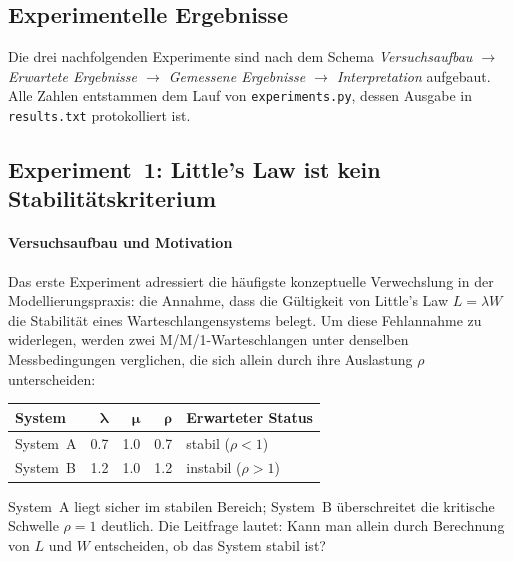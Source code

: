 ﻿\documentclass[a4paper,12pt]{report}
\theoremstyle{definition}
\begin{document}
\subsection{Experimentelle Ergebnisse}
\label{sec:experimentelle-ergebnisse}
\label{subsec:experimente}

Die drei nachfolgenden Experimente sind nach dem Schema
\emph{Versuchsaufbau $\to$ Erwartete Ergebnisse $\to$ Gemessene
	Ergebnisse $\to$ Interpretation} aufgebaut.  Alle Zahlen entstammen
dem Lauf von \texttt{experiments.py}, dessen Ausgabe in
\texttt{results.txt} protokolliert ist.

\subsection{Experiment~1: Little's Law ist kein Stabilitätskriterium}
\label{subsubsec:exp1}

\paragraph{Versuchsaufbau und Motivation}

Das erste Experiment adressiert die häufigste konzeptuelle
Verwechslung in der Modellierungspraxis: die Annahme, dass die
Gültigkeit von Little's Law $L = \lambda W$ die Stabilität eines
Warteschlangensystems belegt.  Um diese Fehlannahme zu widerlegen,
werden zwei M/M/1-Warteschlangen unter denselben Messbedingungen
verglichen, die sich allein durch ihre Auslastung $\rho$ unterscheiden:

\begin{center}
	\begin{tabular}{@{}lrrrl@{}}
		\toprule
		\textbf{System} & $\boldsymbol{\lambda}$ & $\boldsymbol{\mu}$ &
		$\boldsymbol{\rho}$ & \textbf{Erwarteter Status} \\
		\midrule
		System~A & 0.7 & 1.0 & 0.7 & stabil ($\rho < 1$) \\
		System~B & 1.2 & 1.0 & 1.2 & instabil ($\rho > 1$) \\
		\bottomrule
	\end{tabular}
\end{center}

System~A liegt sicher im stabilen Bereich; System~B überschreitet die
kritische Schwelle $\rho = 1$ deutlich.  Die Leitfrage lautet: Kann
man allein durch Berechnung von $L$ und $W$ entscheiden, ob das System
stabil ist?
\end{document}
